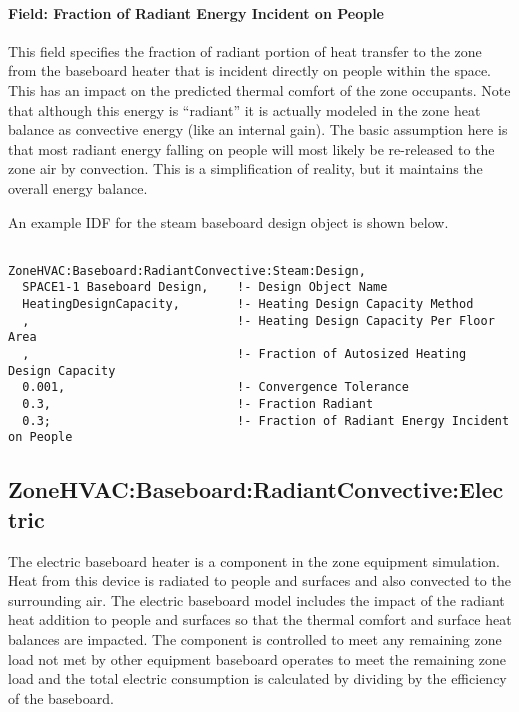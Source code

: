 \paragraph{Field: Fraction of Radiant Energy Incident on People}\label{field-fraction-of-radiant-energy-incident-on-people-1}

This field specifies the fraction of radiant portion of heat transfer to the zone from the baseboard heater that is incident directly on people within the space. This has an impact on the predicted thermal comfort of the zone occupants. Note that although this energy is ``radiant'' it is actually modeled in the zone heat balance as convective energy (like an internal gain). The basic assumption here is that most radiant energy falling on people will most likely be re-released to the zone air by convection. This is a simplification of reality, but it maintains the overall energy balance.

An example IDF for the steam baseboard design object is shown below.

\begin{lstlisting}

ZoneHVAC:Baseboard:RadiantConvective:Steam:Design,
  SPACE1-1 Baseboard Design,    !- Design Object Name
  HeatingDesignCapacity,        !- Heating Design Capacity Method
  ,                             !- Heating Design Capacity Per Floor Area
  ,                             !- Fraction of Autosized Heating Design Capacity
  0.001,                        !- Convergence Tolerance
  0.3,                          !- Fraction Radiant
  0.3;                          !- Fraction of Radiant Energy Incident on People
\end{lstlisting}

\subsection{ZoneHVAC:Baseboard:RadiantConvective:Electric}\label{zonehvacbaseboardradiantconvectiveelectric}

The electric baseboard heater is a component in the zone equipment simulation. Heat from this device is radiated to people and surfaces and also convected to the surrounding air. The electric baseboard model includes the impact of the radiant heat addition to people and surfaces so that the thermal comfort and surface heat balances are impacted. The component is controlled to meet any remaining zone load not met by other equipment baseboard operates to meet the remaining zone load and the total electric consumption is calculated by dividing by the efficiency of the baseboard.

